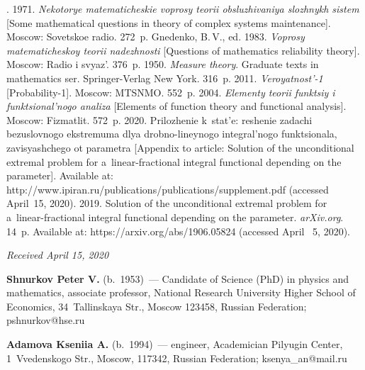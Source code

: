\begin{multicols}{2}
{{\begin{thebibliography}{99}
. 1971. 
\textit{Nekotorye matematicheskie voprosy teorii 
obsluzhivaniya slozhnykh sistem} [Some mathematical questions in theory of complex systems maintenance]. 
Moscow: Sovetskoe radio. 272~p.
Gnedenko, B.\,V., ed. 1983. \textit{Voprosy matematicheskoy teorii nadezhnosti} [Questions of mathematics 
reliability theory]. Moscow: Radio i svyaz'. 376~p.
 1950. \textit{Measure theory}. Graduate texts in mathematics ser.
Springer-Verlag New York. 316~p.
 2011. \textit{Veroyatnost'-1} [Probability-1]. Moscow: MTSNMO. 552~p.
 2004. \textit{Elementy teorii funktsiy i funktsional'nogo 
analiza} [Elements of function theory and functional analysis]. Moscow: Fizmatlit. 572~p.
 2020. Prilozhenie k~stat'e: reshenie zadachi bezuslovnogo 
ekstremuma dlya drobno-lineynogo integral'nogo funktsionala, zavisyashchego ot parametra [Appendix to 
article: Solution of the unconditional extremal problem for a~linear-fractional integral 
functional depending on the parameter]. Available at: {\sf 
http://www.ipiran.ru/publications/\linebreak  publications/supplement.pdf} (accessed April~15, 2020).
 2019. Solution of the unconditional extremal problem for 
a~linear-fractional integral functional depending on the parameter. 
\textit{arXiv.org}. 14~p. Available at: {\sf 
https://arxiv.org/abs/1906.05824} (accessed April ~5, 2020).

\end{thebibliography}

 }
 }

\end{multicols}

\vspace*{-6pt}

\hfill{\small\textit{Received April 15, 2020}}



\Contr

\noindent
\textbf{Shnurkov Peter V.} (b.\ 1953)~--- Candidate of Science (PhD) in physics and mathematics, associate 
professor, National Research University Higher School of Economics, 34~Tallinskaya Str., Moscow 123458, 
Russian Federation; \mbox{pshnurkov@hse.ru}

\vspace*{3pt}

\noindent
\textbf{Adamova Kseniia A.} (b.\ 1994)~--- engineer, Academician Pilyugin Center, 
1~Vvedenskogo Str., Moscow, 117342, Russian Federation; \mbox{ksenya\_an@mail.ru}
\label{end\stat}

\renewcommand{\bibname}{\protect\rm Литература} 
